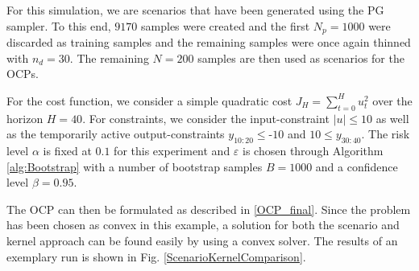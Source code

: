 For this simulation, we are scenarios that have been generated using the PG sampler. To this end, $9170$ samples were created and the first $N_p = 1000$ were discarded as training samples and the remaining samples were once again thinned with $n_d = 30$. The remaining $N = 200$ samples are then used as scenarios for the OCPs.

For the cost function, we consider a simple quadratic cost $J_H = \sum_{t = 0}^H u_t^2$ over the horizon $H = 40$. For constraints, we consider the input-constraint $\left| u \right| \leq 10$ as well as the temporarily active output-constraints $y_{10:20} \leq \text{-} 10$ and $10 \leq y_{30:40}$. The risk level $\alpha$ is fixed at $0.1$ for this experiment and $\varepsilon$ is chosen through Algorithm \ref{alg:Bootstrap} with a number of bootstrap samples $B = 1000$ and a confidence level $\beta = 0.95$.

The OCP can then be formulated as described in \ref{OCP_final}. Since the problem has been chosen as convex in this example, a solution for both the scenario and kernel approach can be found easily by using a convex solver. The results of an exemplary run is shown in Fig. \ref{ScenarioKernelComparison}. 

